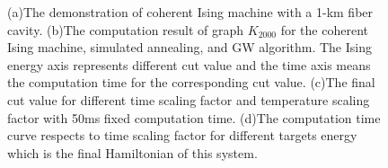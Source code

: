 \documentclass{turabian-researchpaper}
\begin{document}
            \begin{figure}
                \centering
                \caption{(a)The demonstration of coherent Ising machine with a 1-km fiber cavity\cite{2016incoherent}. (b)The computation result of graph $K_{2000}$ for the coherent Ising machine, simulated annealing, and GW algorithm. The Ising energy axis represents different cut value and the time axis means the computation time for the corresponding cut value\cite{2016incoherent}. (c)The final cut value for different time scaling factor and temperature scaling factor with 50ms fixed computation time\cite{2016incoherent}. (d)The computation time curve respects to time scaling factor for different targets energy which is the final Hamiltonian of this system\cite{2016incoherent}.}
            \end{figure}
\end{document}
